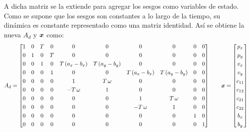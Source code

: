 		A dicha matriz se la extiende para agregar los sesgos como variables de estado. Como se supone que los sesgos son constantes a lo largo de la tiempo, su dinámica es constante representado como una matriz identidad. Así se obtiene la nueva $A_d$ y $\boldsymbol{x}$ como:
		\begin{equation*}
			A_d = \begin{bmatrix}	1& 0& T& 0&           0&           0&           0&           0&      0&      0\\[0.3em]
						0& 1& 0& T&           0&           0&           0&           0&      0&	     0\\[0.3em]
						0& 0& 1& 0& T\,(a_x - b_x)& T\,(a_y - b_y)&           0&           0& 0& 0\\[0.3em]
						0& 0& 0& 1&           0&           0& T\,(a_x - b_x)& T\,(a_y - b_y)& 0& 0\\[0.3em]
						0& 0& 0& 0&           1&         T\,\omega&           0&           0&      0&      0\\[0.3em]
						0& 0& 0& 0&        -T\,\omega&           1&           0&           0&      0&      0\\[0.3em]
						0& 0& 0& 0&           0&           0&           1&         T\,\omega&      0&      0\\[0.3em]
						0& 0& 0& 0&           0&           0&        -T\,\omega&           1&      0&      0\\[0.3em]
						0& 0& 0& 0&           0&           0&           0&           0&      1&      0\\[0.3em]
						0& 0& 0& 0&           0&           0&           0&           0&      0&      1
			\end{bmatrix}\qquad%
			\vect{x} = \begin{bmatrix} {p_x} \\[0.3em] p_y \\[0.3em] {v_x} \\[0.3em] v_y \\[0.3em] c_{11} \\[0.3em] c_{12} \\[0.3em] c_{21} \\[0.3em] c_{22} \\[0.3em] b_x \\[0.3em] b_y \end{bmatrix}
		\end{equation*}

